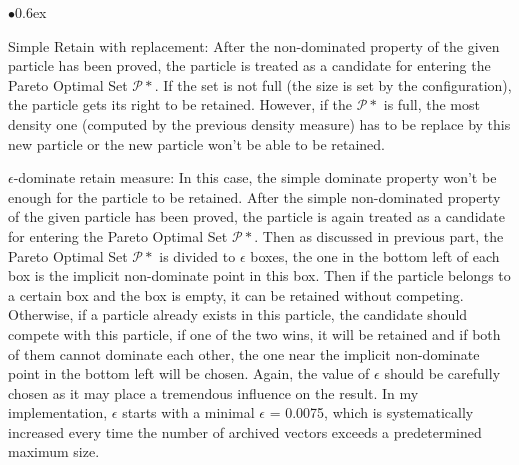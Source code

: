 \documentclass[11pt, runningheads,a4paper]{llncs}
\begin{document}
\begin{list}{$\bullet$}{\itemsep 0.6ex}
\item Simple Retain with replacement: After the non-dominated property of the given particle has been proved, the particle is treated as a candidate for entering the Pareto Optimal Set $\mathcal{P}*$. If the set is not full (the size is set by the configuration), the particle gets its right to be retained. However, if the $\mathcal{P}*$ is full, the most density one (computed by the previous density measure) has to be replace by this new particle or the new particle won't be able to be retained.
\item $\epsilon$-dominate retain measure: In this case, the simple dominate property won't be enough for the particle to be retained. After the simple non-dominated property of the given particle has been proved, the particle is again treated as a candidate for entering the Pareto Optimal Set $\mathcal{P}*$. Then as discussed in previous part, the Pareto Optimal Set $\mathcal{P}*$ is divided to $\epsilon$ boxes, the one in the bottom left of each box is the implicit non-dominate point in this box. Then if the particle belongs to a certain box and the box is empty, it can be retained without competing. Otherwise, if a particle already exists in this particle, the candidate should compete with this particle, if one of the two wins, it will be retained and if both of them cannot dominate each other, the one near the implicit non-dominate point in the bottom left will be chosen.
Again, the value of $\epsilon$ should be carefully chosen as it may place a tremendous influence on the result. In my implementation, $\epsilon$ starts with a minimal $\epsilon$ = 0.0075, which is systematically increased every time the number of archived vectors exceeds a predetermined maximum size. 
\end{list}
\end{document}
